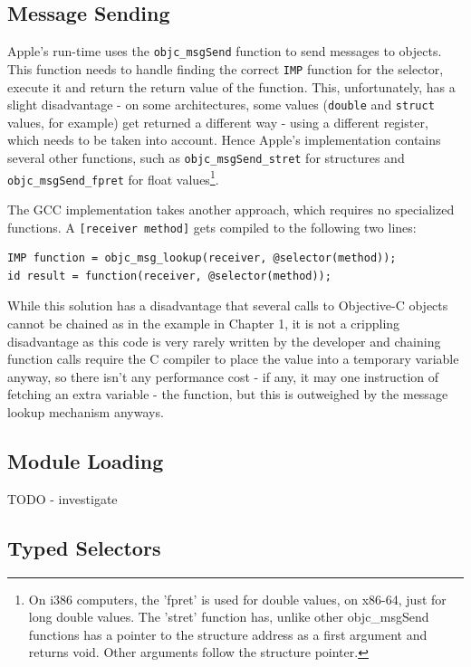 \documentclass[a4paper, 11pt, fleqn]{book}
\begin{document}
\subsection{Message Sending}
Apple's run-time uses the \verb=objc_msgSend= function to send messages to objects. This function needs to handle finding the correct \verb=IMP= function for the selector, execute it and return the return value of the function. This, unfortunately, has a slight disadvantage - on some architectures, some values (\verb=double= and \verb=struct= values, for example) get returned a different way - using a different register, which needs to be taken into account. Hence Apple's implementation contains several other functions, such as \verb=objc_msgSend_stret= for structures and \verb=objc_msgSend_fpret= for float values\footnote{On i386 computers, the 'fpret' is used for double values, on x86-64, just for long double values. The 'stret' function has, unlike other objc\_msgSend functions has a pointer to the structure address as a first argument and returns void. Other arguments follow the structure pointer.}.

The GCC implementation takes another approach, which requires no specialized functions. A \verb=[receiver method]= gets compiled to the following two lines:

\begin{verbatim}
IMP function = objc_msg_lookup(receiver, @selector(method));
id result = function(receiver, @selector(method));
\end{verbatim}

While this solution has a disadvantage that several calls to Objective-C objects cannot be chained as in the example in Chapter 1, it is not a crippling disadvantage as this code is very rarely written by the developer and chaining function calls require the C compiler to place the value into a temporary variable anyway, so there isn't any performance cost - if any, it may one instruction of fetching an extra variable - the function, but this is outweighed by the message lookup mechanism anyways.

\subsection{Module Loading}

TODO - investigate

\subsection{Typed Selectors}
\end{document}
